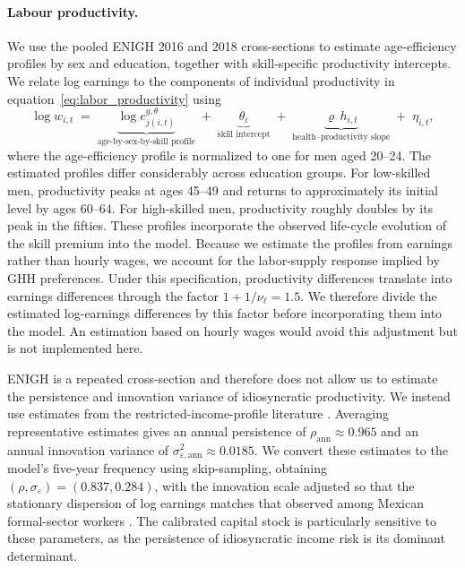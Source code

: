 \documentclass[12pt,a4paper]{article}
\begin{document}
\paragraph{Labour productivity.}
We use the pooled ENIGH 2016 and 2018 cross-sections to estimate age-efficiency profiles by sex and education, together with skill-specific productivity intercepts. We relate log earnings to the components of individual productivity in equation~\eqref{eq:labor_productivity} using
\begin{equation}
\label{eq:logwage_decomp}
\log w_{i,t} \;=\; \underbrace{\log e^{g,\theta}_{j(i,t)}}_{\text{age-by-sex-by-skill profile}} \;+\; \underbrace{\theta_{i}}_{\text{skill intercept}} \;+\; \underbrace{\varrho\, h_{i,t}}_{\text{health--productivity slope}} \;+\; \eta_{i,t},
\end{equation}
where the age-efficiency profile is normalized to one for men aged 20--24. The estimated profiles differ considerably across education groups. For low-skilled men, productivity peaks at ages 45--49 and returns to approximately its initial level by ages 60--64. For high-skilled men, productivity roughly doubles by its peak in the fifties. These profiles incorporate the observed life-cycle evolution of the skill premium into the model. Because we estimate the profiles from earnings rather than hourly wages, we account for the labor-supply response implied by GHH preferences. Under this specification, productivity differences translate into earnings differences through the factor $1+1/\nu_\ell=1.5$. We therefore divide the estimated log-earnings differences by this factor before incorporating them into the model. An estimation based on hourly wages would avoid this adjustment but is not implemented here.

ENIGH is a repeated cross-section and therefore does not allow us to estimate the persistence and innovation variance of idiosyncratic productivity. We instead use estimates from the restricted-income-profile literature \citep{StoreslettenTelmerYaron2004, Guvenen2009, HubbardSkinnerZeldes1994}. Averaging representative estimates gives an annual persistence of $\rho_{\mathrm{ann}}\approx0.965$ and an annual innovation variance of $\sigma^2_{\varepsilon,\mathrm{ann}}\approx0.0185$. We convert these estimates to the model's five-year frequency using skip-sampling, obtaining $(\rho,\sigma_\varepsilon)=(0.837,0.284)$, with the innovation scale adjusted so that the stationary dispersion of log earnings matches that observed among Mexican formal-sector workers \citep{Puggioni2022}. The calibrated capital stock is particularly sensitive to these parameters, as the persistence of idiosyncratic income risk is its dominant determinant.
\end{document}
